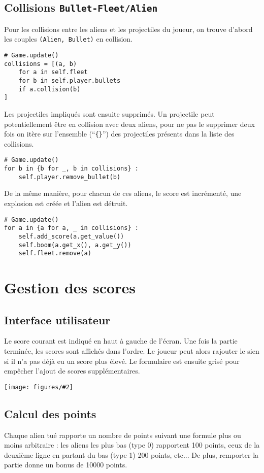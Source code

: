 \documentclass[12pt]{article}
\newcommand{\pic}[2][]{
\begin{center}
\begin{adjustbox}{max size={\textwidth}{\textheight}}
	\texttt{[image: figures/\#2]}
\end{adjustbox}
\end{center}
}
\begin{document}
	
	\subsection{Collisions \texttt{Bullet-Fleet/Alien}}

	Pour les collisions entre les aliens et les projectiles du joueur, on trouve d'abord les couples \texttt{(Alien, Bullet)} en collision.


\begin{verbatim}
# Game.update()
collisions = [(a, b)
	for a in self.fleet
	for b in self.player.bullets
	if a.collision(b)
]
\end{verbatim}

	Les projectiles impliqués sont ensuite supprimés. Un projectile peut potentiellement être en collision avec deux aliens, pour ne pas le supprimer deux fois on itère sur l'ensemble (\enquote{\texttt{\{\}}}) des projectiles présents dans la liste des collisions.

\begin{verbatim}
# Game.update()
for b in {b for _, b in collisions} :
	self.player.remove_bullet(b)
\end{verbatim}
	
	De la même manière, pour chacun de ces aliens, le score est incrémenté, une explosion est créée et l'alien est détruit.

\begin{verbatim}
# Game.update()
for a in {a for a, _ in collisions} :
	self.add_score(a.get_value())
	self.boom(a.get_x(), a.get_y())
	self.fleet.remove(a)
\end{verbatim}
	

\vfill
\section{Gestion des scores}


\subsection{Interface utilisateur}
	Le score courant est indiqué en haut à gauche de l'écran. Une fois la partie terminée, les scores sont affichés dans l'ordre. Le joueur peut alors rajouter le sien si il n'a pas déjà eu un score plus élevé. Le formulaire est ensuite grisé pour empêcher l'ajout de scores supplémentaires.

\newpage
\pic{highscores.png}


\subsection{Calcul des points}
	Chaque alien tué rapporte un nombre de points suivant une formule plus ou moins arbitraire : les aliens les plus bas (type 0) rapportent 100 points, ceux de la deuxième ligne en partant du bas (type 1) 200 points, etc... De plus, remporter la partie donne un bonus de 10000 points.
\end{document}
